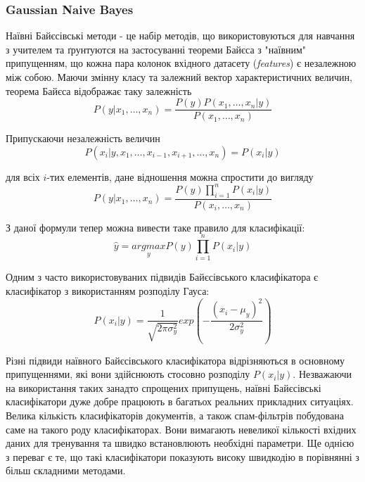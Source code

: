 \subsubsection{Gaussian Naive Bayes}
Наївні Байєсівські методи - це набір методів, що використовуються для навчання з учителем та ґрунтуются на застосуванні теореми Байєса з "наївним" припущенням, що кожна пара колонок вхідного датасету (\textit{features}) є незалежною між собою. Маючи змінну класу та залежний вектор характеристичних величин, теорема Байєса відображає таку залежність 
\begin{equation}
    \label{eq:naive_bayes_0}
    P(y|x_{1}, \ldots, x_{n}) = \frac{P(y)P(x_{1}, \ldots, x_{n}|y)}{P(x_{1}, \ldots, x_{n})}
\end{equation}

Припускаючи незалежність величин
\begin{equation}
    \label{eq:naive_bayes_1}
    P(x_{i}|y, x_{1}, \ldots, x_{i-1}, x_{i+1}, \ldots, x_{n}) = P(x_{i}|y)
\end{equation}

для всіх $i$-тих елементів, дане відношення можна спростити до вигляду
\begin{equation}
    \label{eq:naive_bayes_2}
    P(y|x_{1}, \ldots, x_{n}) = \frac{P(y)\prod_{i=1}^n P(x_{i}|y)}{P(x_{i}, \ldots, x_{n})}
\end{equation}

З даної формули тепер можна вивести таке правило для класифікації:
\begin{equation}
    \label{eq:naive_bayes_3}
    \hat{y} = \underset{y}{argmax}P(y)\prod_{i=1}^n P(x_{i}|y)
\end{equation}

Одним з часто використовуваних підвидів Байєсівського класифікатора є класифікатор з використанням розподілу Гауса:
\begin{equation}
    \label{eq:naive_bayes_4}
    P(x_{i}|y) = \frac{1}{\sqrt{2\pi\sigma_{y}^2}}exp(-\frac{(x_{i}-\mu_{y})^2}{2\sigma_{y}^2})
\end{equation}

Різні підвиди наївного Байєсівського класифікатора відрізняються в основному припущеннями, які вони здійснюють стосовно розподілу $P(x_{i}|y)$. Незважаючи на використання таких занадто спрощених припущень, наївні Байєсівські класифікатори дуже добре працюють в багатьох реальних прикладних ситуаціях. Велика кількість класифікаторів документів, а також спам-фільтрів побудована саме на такого роду класифікаторах. Вони вимагають невеликої кількості вхідних даних для тренування та швидко встановлюють необхідні параметри. Ще однією з переваг є те, що такі класифікатори показують високу швидкодію в порівнянні з більш складними методами.


